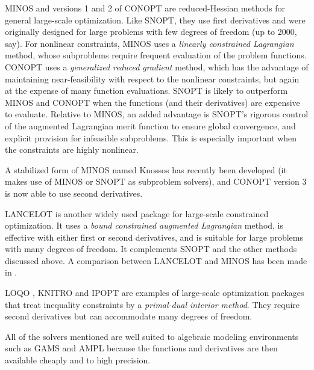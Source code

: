\documentclass[draft,leqno,onefignum,onetabnum]{siamltex}
\def\AMPL  {{\small AMPL}}
\def\CONOPT{{\small CONOPT}}
\def\GAMS  {{\small GAMS}}
\def\IPOPT {{\small IPOPT}}
\def\KNITRO{{\small KNITRO}}
\def\Knossos{{\small \sc Knossos}}
\def\LANCELOT{{\small LANCELOT}}
\def\LOQO  {{\small LOQO}}
\def\MINOS {{\small MINOS}}
\def\SNOPT {{\small SNOPT}}
\begin{document}
\MINOS{} and versions 1 and 2 of \CONOPT{} are reduced-Hessian methods
for general large-scale optimization.
Like \SNOPT, they use first derivatives and were originally designed
for large problems with few degrees of freedom (up to 2000, say).
For nonlinear constraints, \MINOS{} uses a \emph{linearly constrained
  Lagrangian} method, whose subproblems require frequent evaluation of
the problem functions.
\CONOPT{} uses a \emph{generalized reduced gradient} method,
which has the advantage of maintaining near-feasibility
with respect to the nonlinear constraints,
but again at the expense of many function evaluations.
\SNOPT{} is likely to outperform \MINOS{} and \CONOPT{} when
the functions (and their derivatives) are expensive to evaluate.
Relative to \MINOS, an added advantage is \SNOPT's rigorous control of
the augmented Lagrangian merit function to ensure global convergence,
and explicit provision for infeasible subproblems.
This is especially important when the constraints are highly
nonlinear.

A stabilized form of \MINOS{} named \Knossos{} has recently been
developed \cite{FriS05} (it makes use of \MINOS{} or \SNOPT{}
as subproblem solvers), and \CONOPT{} version 3 \cite{CONOPT}
is now able to use second derivatives.

 \LANCELOT{} \cite{CGT92a,Gould:2003:GLT} is another widely used
package for large-scale constrained optimization.  It uses a
\emph{bound constrained augmented Lagrangian} method,
is effective with either first or second derivatives,
and is suitable for large problems with many degrees of freedom.
It complements \SNOPT{} and the other methods discussed above.
A comparison between  \LANCELOT{}
and \MINOS{} has been made in \cite{BCGST97a,BCGST97b}.

 \LOQO{} \cite{VanS99}, \KNITRO{} \cite{ByrHN99,ByrGN00}
and \IPOPT{} \cite{IPOPT} are
examples of large-scale optimization packages that treat inequality
constraints by a \emph{primal-dual interior method}.  They require
second derivatives but can accommodate many degrees of freedom.

All of the solvers mentioned are well suited to algebraic modeling
environments such as \GAMS{} \cite{GAMS} and \AMPL{} \cite{AMPL}
because the functions and derivatives are then available cheaply
and to high precision.
\end{document}
